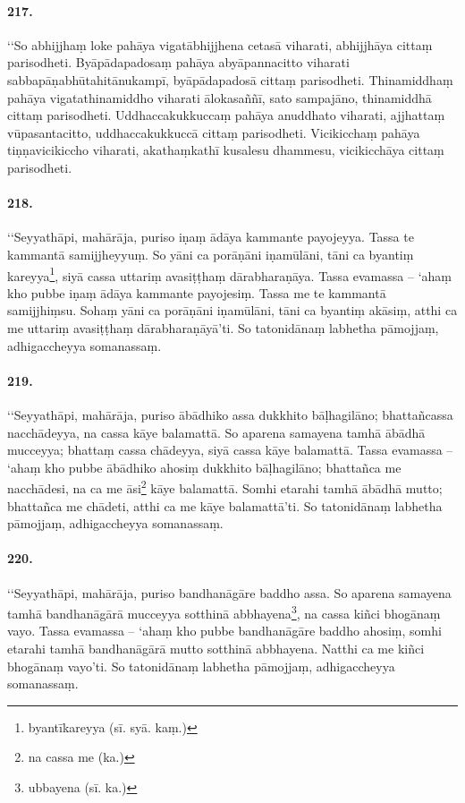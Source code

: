 \paragraph{217.} ‘‘So abhijjhaṃ loke pahāya vigatābhijjhena cetasā viharati, abhijjhāya cittaṃ parisodheti. Byāpādapadosaṃ pahāya abyāpannacitto viharati sabbapāṇabhūtahitānukampī, byāpādapadosā cittaṃ parisodheti. Thinamiddhaṃ pahāya vigatathinamiddho viharati ālokasaññī, sato sampajāno, thinamiddhā cittaṃ parisodheti. Uddhaccakukkuccaṃ pahāya anuddhato viharati, ajjhattaṃ vūpasantacitto, uddhaccakukkuccā cittaṃ parisodheti. Vicikicchaṃ pahāya tiṇṇavicikiccho viharati, akathaṃkathī kusalesu dhammesu, vicikicchāya cittaṃ parisodheti.

\paragraph{218.} ‘‘Seyyathāpi, mahārāja, puriso iṇaṃ ādāya kammante payojeyya. Tassa te kammantā samijjheyyuṃ. So yāni ca porāṇāni iṇamūlāni, tāni ca byantiṃ kareyya\footnote{byantīkareyya (sī. syā. kaṃ.)}, siyā cassa uttariṃ avasiṭṭhaṃ dārabharaṇāya. Tassa evamassa – ‘ahaṃ kho pubbe iṇaṃ ādāya kammante payojesiṃ. Tassa me te kammantā samijjhiṃsu. Sohaṃ yāni ca porāṇāni iṇamūlāni, tāni ca byantiṃ akāsiṃ, atthi ca me uttariṃ avasiṭṭhaṃ dārabharaṇāyā’ti. So tatonidānaṃ labhetha pāmojjaṃ, adhigaccheyya somanassaṃ.

\paragraph{219.} ‘‘Seyyathāpi, mahārāja, puriso ābādhiko assa dukkhito bāḷhagilāno; bhattañcassa nacchādeyya, na cassa kāye balamattā. So aparena samayena tamhā ābādhā mucceyya; bhattaṃ cassa chādeyya, siyā cassa kāye balamattā. Tassa evamassa – ‘ahaṃ kho pubbe ābādhiko ahosiṃ dukkhito bāḷhagilāno; bhattañca me nacchādesi, na ca me āsi\footnote{na cassa me (ka.)} kāye balamattā. Somhi etarahi tamhā ābādhā mutto; bhattañca me chādeti, atthi ca me kāye balamattā’ti. So tatonidānaṃ labhetha pāmojjaṃ, adhigaccheyya somanassaṃ.

\paragraph{220.} ‘‘Seyyathāpi, mahārāja, puriso bandhanāgāre baddho assa. So aparena samayena tamhā bandhanāgārā mucceyya sotthinā abbhayena\footnote{ubbayena (sī. ka.)}, na cassa kiñci bhogānaṃ vayo. Tassa evamassa – ‘ahaṃ kho pubbe bandhanāgāre baddho ahosiṃ, somhi etarahi tamhā bandhanāgārā mutto sotthinā abbhayena. Natthi ca me kiñci bhogānaṃ vayo’ti. So tatonidānaṃ labhetha pāmojjaṃ, adhigaccheyya somanassaṃ.

